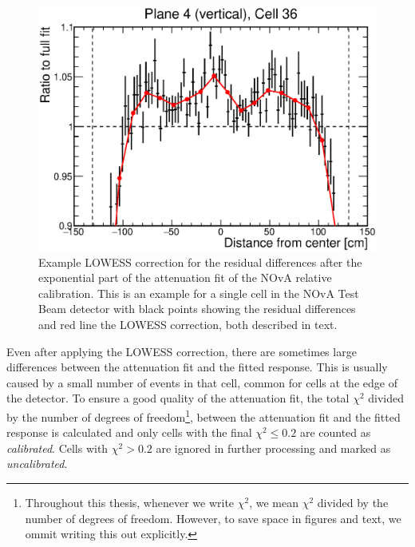\begin{figure}
    \centering
    \includegraphics[width=.7\textwidth]{Plots/NOvAExperiment/ExampleLOWESSFit.eps}
    \caption[Example LOWESS correction for NOvA relative calibration]{Example \acrshort{LOWESS} correction for the residual differences after the exponential part of the attenuation fit of the \acrshort{NOvA} relative calibration. This is an example for a single cell in the \acrshort{NOvA} Test Beam detector with black points showing the residual differences and red line the \acrshort{LOWESS} correction, both described in text.}
    \label{fig:NOvACalibrationLOWESSCorrection}
\end{figure}

Even after applying the \gls{LOWESS} correction, there are sometimes large differences between the attenuation fit and the fitted response. This is usually caused by a small number of events in that cell, common for cells at the edge of the detector. To ensure a good quality of the attenuation fit, the total $\chi^2$ divided by the number of degrees of freedom\footnote{Throughout this thesis, whenever we write $\chi^2$, we mean $\chi^2$ divided by the number of degrees of freedom. However, to save space in figures and text, we ommit writing this out explicitly.}, between the attenuation fit and the fitted response is calculated and only cells with the final $\chi^2\leq 0.2$ are counted as \textit{calibrated}. Cells with $\chi^2>0.2$ are ignored in further processing and marked as \textit{uncalibrated}.


